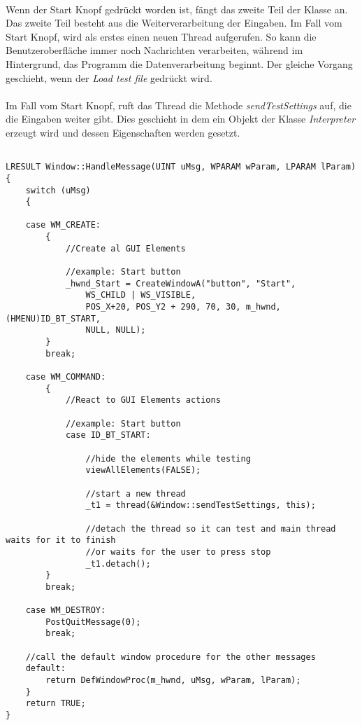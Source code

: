 \paragraph{}
Wenn der Start Knopf gedrückt worden ist, fängt das zweite Teil der Klasse an. Das zweite Teil besteht aus die Weiterverarbeitung der Eingaben. Im Fall vom Start Knopf, wird als erstes einen neuen Thread aufgerufen. So kann die Benutzeroberfläche immer noch Nachrichten verarbeiten, während im Hintergrund, das Programm die Datenverarbeitung beginnt. Der gleiche Vorgang geschieht, wenn der \textit{Load test file} gedrückt wird.

\paragraph{}
Im Fall vom Start Knopf, ruft das Thread die Methode \textit{sendTestSettings} auf, die die Eingaben weiter gibt. Dies geschieht in dem ein Objekt der Klasse \textit{Interpreter} erzeugt wird und dessen Eigenschaften werden gesetzt.



\begin{lstlisting}	

LRESULT Window::HandleMessage(UINT uMsg, WPARAM wParam, LPARAM lParam)
{
    switch (uMsg)
    {

    case WM_CREATE:
        {
            //Create al GUI Elements
            
            //example: Start button
            _hwnd_Start = CreateWindowA("button", "Start",
				WS_CHILD | WS_VISIBLE,
				POS_X+20, POS_Y2 + 290, 70, 30, m_hwnd, (HMENU)ID_BT_START,
				NULL, NULL);
        }
        break;
        
    case WM_COMMAND:
        {
            //React to GUI Elements actions
            
            //example: Start button
            case ID_BT_START:

				//hide the elements while testing
				viewAllElements(FALSE);

				//start a new thread
				_t1 = thread(&Window::sendTestSettings, this);
				
				//detach the thread so it can test and main thread waits for it to finish
				//or waits for the user to press stop
				_t1.detach();
        }
        break;
        
    case WM_DESTROY:
        PostQuitMessage(0);
        break;

	//call the default window procedure for the other messages
    default:
        return DefWindowProc(m_hwnd, uMsg, wParam, lParam);
    }
    return TRUE;
}

\end{lstlisting}





